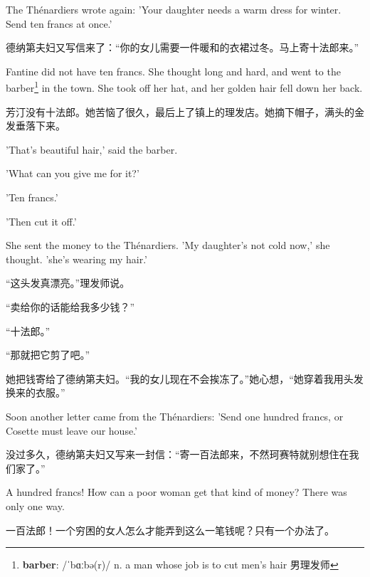 \documentclass[fontset=ubuntu, zihao=5]{ctexart}
\newcommand\doulos[1]{{\fontspec{Doulos SIL} /#1/}}
\begin{document}
\begin{paracol}{2}
  \switchcolumn*

  The Thénardiers wrote again: 'Your daughter needs a warm dress for winter. Send ten francs at once.'

  \switchcolumn

  德纳第夫妇又写信来了：“你的女儿需要一件暖和的衣裙过冬。马上寄十法郎来。”

  \switchcolumn*

  Fantine did not have ten francs. She thought long and hard, and went to the
  barber\footnote{\textbf{barber}: \doulos{ˈbɑːbə(r)} n. a man whose job is
    to cut men's hair 男理发师} in the town. She took off her hat, and her
  golden hair fell down her back.

  \switchcolumn

  芳汀没有十法郎。她苦恼了很久，最后上了镇上的理发店。她摘下帽子，满头的金发垂落下来。

  \switchcolumn*

  'That's beautiful hair,' said the barber.


  'What can you give me for it?'


  'Ten francs.'


  'Then cut it off.'


  She sent the money to the Thénardiers. 'My daughter's not cold now,' she thought. 'she's wearing my hair.'

  \switchcolumn

  “这头发真漂亮。”理发师说。


  “卖给你的话能给我多少钱？”


  “十法郎。”


  “那就把它剪了吧。”


  她把钱寄给了德纳第夫妇。“我的女儿现在不会挨冻了。”她心想，“她穿着我用头发换来的衣服。”

  \switchcolumn*

  Soon another letter came from the Thénardiers: 'Send one hundred francs, or Cosette must leave our house.'

  \switchcolumn

  没过多久，德纳第夫妇又写来一封信：“寄一百法郎来，不然珂赛特就别想住在我们家了。”

  \switchcolumn*

  A hundred francs! How can a poor woman get that kind of money? There was only one way.

  \switchcolumn

  一百法郎！一个穷困的女人怎么才能弄到这么一笔钱呢？只有一个办法了。


\end{paracol}
\end{document}

